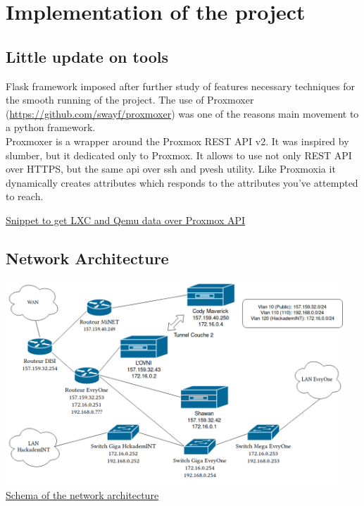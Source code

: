 \pagebreak

\section{Implementation of the project}

\subsection{Little update on tools}

Flask framework imposed after further study of features
necessary techniques for the smooth running of the project. The use of
Proxmoxer (\url{https://github.com/swayf/proxmoxer}) was one of the reasons
main movement to a python framework. \\

Proxmoxer is a wrapper around the Proxmox REST API v2.
It was inspired by slumber, but it dedicated only to Proxmox. It allows to use not only REST API over HTTPS, but the same api over ssh and pvesh utility.
Like Proxmoxia it dynamically creates attributes which responds to the attributes you've attempted to reach.
\\


\begin{center}

\underline{Snippet to get LXC and Qemu data over Proxmox API}

\end{center}

\subsection{Network Architecture}

\vspace{2cm}

\begin{center}
\includegraphics[width=0.95\textwidth]{images/reseau.png}
\\
\underline{Schema of the network architecture}
\end{center}

